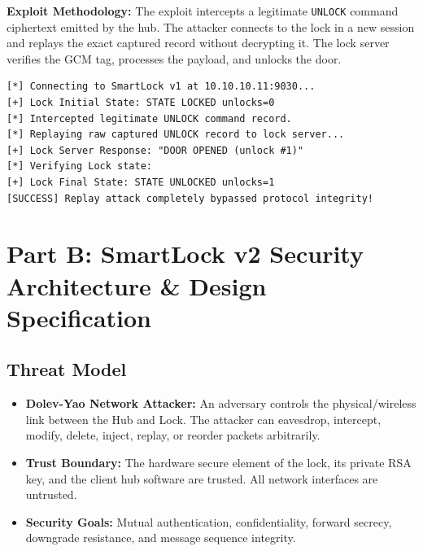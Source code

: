 \documentclass[11pt,a4paper]{article}
\begin{document}
\textbf{Exploit Methodology:}  
The exploit intercepts a legitimate \texttt{UNLOCK} command ciphertext emitted by the hub. The attacker connects to the lock in a new session and replays the exact captured record without decrypting it. The lock server verifies the GCM tag, processes the payload, and unlocks the door.

\begin{lstlisting}[caption={Stage A.5 Terminal Output (\texttt{23i-0614-G-TASKA5-V1})}]
[*] Connecting to SmartLock v1 at 10.10.10.11:9030...
[+] Lock Initial State: STATE LOCKED unlocks=0
[*] Intercepted legitimate UNLOCK command record.
[*] Replaying raw captured UNLOCK record to lock server...
[+] Lock Server Response: "DOOR OPENED (unlock #1)"
[*] Verifying Lock state:
[+] Lock Final State: STATE UNLOCKED unlocks=1
[SUCCESS] Replay attack completely bypassed protocol integrity!
\end{lstlisting}

\newpage

\section{Part B: SmartLock v2 Security Architecture \& Design Specification}

\subsection{Threat Model}
\begin{itemize}
    \item \textbf{Dolev-Yao Network Attacker:} An adversary controls the physical/wireless link between the Hub and Lock. The attacker can eavesdrop, intercept, modify, delete, inject, replay, or reorder packets arbitrarily.
    \item \textbf{Trust Boundary:} The hardware secure element of the lock, its private RSA key, and the client hub software are trusted. All network interfaces are untrusted.
    \item \textbf{Security Goals:} Mutual authentication, confidentiality, forward secrecy, downgrade resistance, and message sequence integrity.
\end{itemize}
\end{document}

